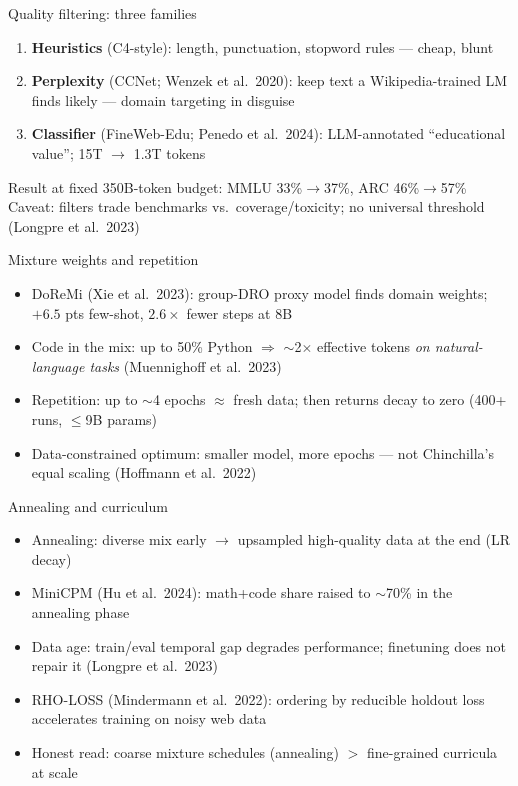 \documentclass[aspectratio=169,11pt]{beamer}
\begin{document}
\begin{frame}{Quality filtering: three families}
\begin{enumerate}
\item \textbf{Heuristics} (C4-style): length, punctuation, stopword rules --- cheap, blunt
\item \textbf{Perplexity} (CCNet; Wenzek et al.\ 2020): keep text a Wikipedia-trained LM finds likely --- domain targeting in disguise
\item \textbf{Classifier} (FineWeb-Edu; Penedo et al.\ 2024): LLM-annotated ``educational value''; 15T $\to$ 1.3T tokens
\end{enumerate}
\vspace{0.5em}
Result at fixed 350B-token budget: MMLU 33\%$\to$37\%, ARC 46\%$\to$57\%\\
Caveat: filters trade benchmarks vs.\ coverage/toxicity; no universal threshold (Longpre et al.\ 2023)
\end{frame}

\begin{frame}{Mixture weights and repetition}
\begin{itemize}
\item DoReMi (Xie et al.\ 2023): group-DRO proxy model finds domain weights; $+6.5$ pts few-shot, $2.6\times$ fewer steps at 8B
\item Code in the mix: up to 50\% Python $\Rightarrow$ $\sim$2$\times$ effective tokens \emph{on natural-language tasks} (Muennighoff et al.\ 2023)
\item Repetition: up to $\sim$4 epochs $\approx$ fresh data; then returns decay to zero (400+ runs, $\leq$9B params)
\item Data-constrained optimum: smaller model, more epochs --- not Chinchilla's equal scaling (Hoffmann et al.\ 2022)
\end{itemize}
\end{frame}

\begin{frame}{Annealing and curriculum}
\begin{itemize}
\item Annealing: diverse mix early $\to$ upsampled high-quality data at the end (LR decay)
\item MiniCPM (Hu et al.\ 2024): math+code share raised to $\sim$70\% in the annealing phase
\item Data age: train/eval temporal gap degrades performance; finetuning does not repair it (Longpre et al.\ 2023)
\item RHO-LOSS (Mindermann et al.\ 2022): ordering by reducible holdout loss accelerates training on noisy web data
\item Honest read: coarse mixture schedules (annealing) $>$ fine-grained curricula at scale
\end{itemize}
\end{frame}
\end{document}
